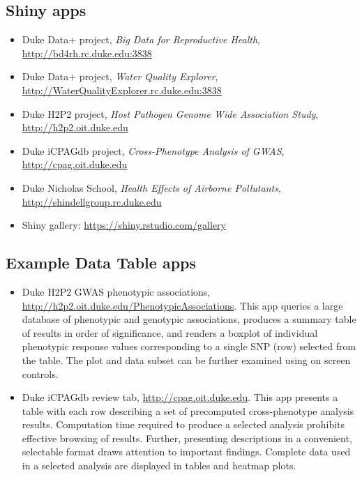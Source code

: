 \documentclass[10pt, letterpaper]{article}
\begin{document}
\begin{spacing}{1.0}
\subsection{Shiny apps}\label{sec:exampleapps}
\begin{itemize}
    \item Duke Data+ project, \textit{Big Data for Reproductive Health}, \url{http://bd4rh.rc.duke.edu:3838}
    \item Duke Data+ project, \textit{Water Quality Explorer}, \url{http://WaterQualityExplorer.rc.duke.edu:3838}
    \item Duke H2P2 project, \textit{Host Pathogen Genome Wide Association Study}, \url{http://h2p2.oit.duke.edu}
    \item Duke iCPAGdb project, \textit{Cross-Phenotype Analysis of GWAS}, \url{http://cpag.oit.duke.edu}
    \item Duke Nicholas School, \textit{Health Effects of Airborne Pollutants}, \url{http://shindellgroup.rc.duke.edu}
    \item Shiny gallery:  \url{https://shiny.rstudio.com/gallery}
\end{itemize}

\subsection{Example Data Table apps}\label{sec:examplesDT}

\begin{itemize}
    
    \item Duke H2P2 GWAS phenotypic associations, \url{http://h2p2.oit.duke.edu/PhenotypicAssociations}.  This app queries a large database of phenotypic and genotypic associations, produces a summary table of results in order of significance, and renders a boxplot of individual phenotypic response values corresponding to a single SNP (row) selected from the table.  The plot and data subset can be further examined using on screen controls.
    
    \item Duke iCPAGdb review tab, \url{http://cpag.oit.duke.edu}.  This app presents a table with each row describing a set of precomputed cross-phenotype analysis results.  Computation time required to produce a selected analysis prohibits effective browsing of results.  Further, presenting descriptions in a convenient, selectable format draws attention to important findings.  Complete data used in a selected analysis are displayed in tables and heatmap plots. 
    

\end{itemize}
\end{spacing}
\end{document}
